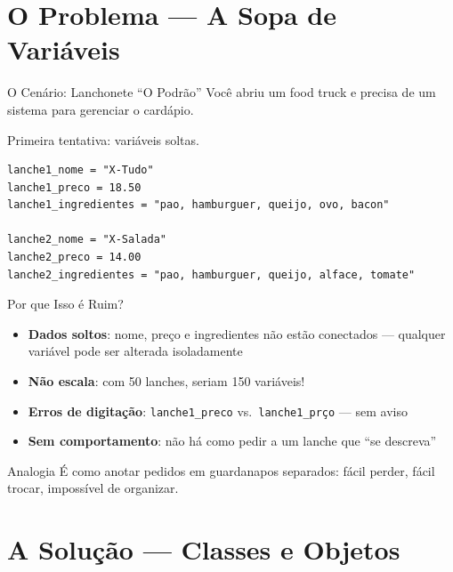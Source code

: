 \documentclass[aspectratio=169]{beamer}
\begin{document}
\section{O Problema --- A Sopa de Variáveis}

\begin{frame}[fragile]{O Cenário: Lanchonete ``O Podrão''}
  Você abriu um food truck e precisa de um sistema para gerenciar
  o cardápio.

  \vspace{0.3cm}
  Primeira tentativa: variáveis soltas.

  \begin{lstlisting}
lanche1_nome = "X-Tudo"
lanche1_preco = 18.50
lanche1_ingredientes = "pao, hamburguer, queijo, ovo, bacon"

lanche2_nome = "X-Salada"
lanche2_preco = 14.00
lanche2_ingredientes = "pao, hamburguer, queijo, alface, tomate"
  \end{lstlisting}
\end{frame}

\begin{frame}{Por que Isso é Ruim?}
  \begin{itemize}
    \item \textbf{Dados soltos}: nome, preço e ingredientes não estão
          conectados --- qualquer variável pode ser alterada isoladamente
    \item \textbf{Não escala}: com 50 lanches, seriam 150 variáveis!
    \item \textbf{Erros de digitação}: \texttt{lanche1\_preco} vs.\
          \texttt{lanche1\_prço} --- sem aviso
    \item \textbf{Sem comportamento}: não há como pedir a um lanche
          que ``se descreva''
  \end{itemize}

  \vspace{0.5cm}
  \begin{alertblock}{Analogia}
    É como anotar pedidos em guardanapos separados:
    fácil perder, fácil trocar, impossível de organizar.
  \end{alertblock}
\end{frame}

\section{A Solução --- Classes e Objetos}
\end{document}
